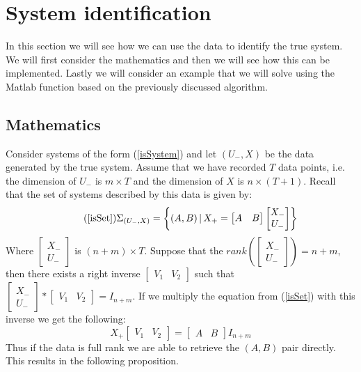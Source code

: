 \section{System identification}
In this section we will see how we can use the data to identify the true system. We will first consider the mathematics and then we will see how this can be implemented. Lastly we will consider an example that we will solve using the Matlab function based on the previously discussed algorithm.


\subsection{Mathematics}
Consider systems of the form (\ref{isSystem}) and let $(U_-,X)$ be the data generated by the true system. Assume that we have recorded $T$ data points, i.e. the dimension of $U_-$ is $m \times T$ and the dimension of $X$ is $n \times (T+1)$. Recall that the set of systems described by this data is given by:
\begin{equation}
	\tag{\ref{isSet}} 
	\Sigma_{(U_-,X)} = \left\{ (A, B) \, | \, X_{+} = \begin{bmatrix} A & B \end{bmatrix} \begin{bmatrix} X_{-} \\ U_{-} \end{bmatrix} \right\} 
\end{equation}
Where $\begin{bmatrix} X_{-} \\ U_{-} \end{bmatrix}$ is $(n+m) \times T$. Suppose that the $rank\left( \begin{bmatrix} X_{-} \\ U_{-} \end{bmatrix} \right) = n+m$, then there exists a right inverse $\begin{bmatrix} V_1 & V_2 \end{bmatrix}$ such that $\begin{bmatrix} X_{-} \\ U_{-} \end{bmatrix} * \begin{bmatrix} V_1 & V_2 \end{bmatrix} = I_{n+m}$. If we multiply the equation from (\ref{isSet}) with this inverse we get the following:
\begin{equation*}
	X_{+} \begin{bmatrix} V_1 & V_2 \end{bmatrix} = \begin{bmatrix} A & B \end{bmatrix} I_{n+m}
\end{equation*}
Thus if the data is full rank we are able to retrieve the $(A,B)$ pair directly. This results in the following proposition.


